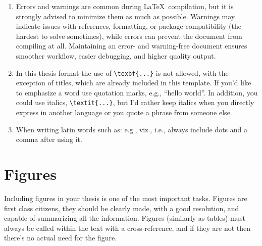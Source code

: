 \begin{enumerate}
  \item Errors and warnings are common during \LaTeX\ compilation, but it is strongly advised to minimize them as much as possible. Warnings may indicate issues with references, formatting, or package compatibility (the hardest to solve sometimes), while errors can prevent the document from compiling at all. Maintaining an error- and warning-free document ensures smoother workflow, easier debugging, and higher quality output.
  
  \item In this thesis format the use of \verb|\texbf{...}| is not allowed, with the exception of titles, which are already included in this template. If you'd like to emphasize a word use quotation marks, e.g., ``hello world''. In addition, you could use italics, \verb|\textit{...}|, but I'd rather keep italics when you directly express in another language or you quote a phrase from someone else.
  
  \item When writing latin words such as: e.g., viz., i.e., always include dots and a comma after using it.
  
  
\end{enumerate}


\section{Figures}
\label{sec:figures}

Including figures in your thesis is one of the most important tasks. Figures are first class citizens, they should be clearly made, with a good resolution, and capable of summarizing all the information. Figures (similarly as tables) must always be called within the text with a cross-reference, and if they are not then there's no actual need for the figure.

